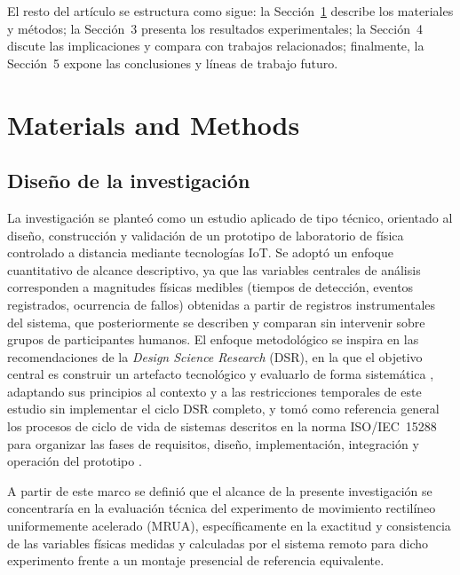 \documentclass[journal,article,submit,pdftex]{Definitions/mdpi}
\begin{document}
El resto del art\'iculo se estructura como sigue: la Secci\'on~\ref{sec:metodos} describe los materiales y m\'etodos; la Secci\'on~3 presenta los resultados experimentales; la Secci\'on~4 discute las implicaciones y compara con trabajos relacionados; finalmente, la Secci\'on~5 expone las conclusiones y l\'ineas de trabajo futuro.


\section{Materials and Methods}
\label{sec:metodos}

\subsection{Dise\~no de la investigaci\'on}

La investigaci\'on se plante\'o como un estudio aplicado de tipo t\'ecnico, orientado al dise\~no, construcci\'on y validaci\'on de un prototipo de laboratorio de f\'isica controlado a distancia mediante tecnolog\'ias IoT. Se adopt\'o un enfoque cuantitativo de alcance descriptivo, ya que las variables centrales de an\'alisis corresponden a magnitudes f\'isicas medibles (tiempos de detecci\'on, eventos registrados, ocurrencia de fallos) obtenidas a partir de registros instrumentales del sistema, que posteriormente se describen y comparan sin intervenir sobre grupos de participantes humanos. El enfoque metodol\'ogico se inspira en las recomendaciones de la \textit{Design Science Research} (DSR), en la que el objetivo central es construir un artefacto tecnol\'ogico y evaluarlo de forma sistem\'atica \cite{r16}, adaptando sus principios al contexto y a las restricciones temporales de este estudio sin implementar el ciclo DSR completo, y tom\'o como referencia general los procesos de ciclo de vida de sistemas descritos en la norma ISO/IEC~15288 para organizar las fases de requisitos, dise\~no, implementaci\'on, integraci\'on y operaci\'on del prototipo \cite{r17}.

A partir de este marco se defini\'o que el alcance de la presente investigaci\'on se concentrar\'ia en la evaluaci\'on t\'ecnica del experimento de movimiento rectil\'ineo uniformemente acelerado (MRUA), espec\'ificamente en la exactitud y consistencia de las variables f\'isicas medidas y calculadas por el sistema remoto para dicho experimento frente a un montaje presencial de referencia equivalente.
\end{document}
